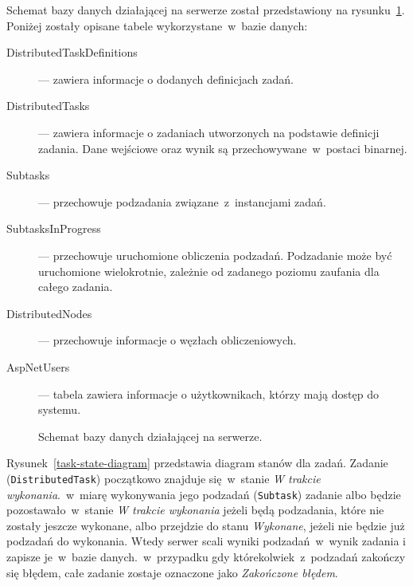 \documentclass[a4paper,11pt,twoside]{report}
\theoremstyle{definition}
\begin{document}
Schemat bazy danych działającej na serwerze został przedstawiony na rysunku~\ref{database-schema}.
Poniżej zostały opisane tabele wykorzystane~w~bazie danych:
\begin{description}
    \item [DistributedTaskDefinitions] --- zawiera informacje o dodanych definicjach zadań.
    \item [DistributedTasks] --- zawiera informacje o zadaniach utworzonych na podstawie definicji zadania. Dane wejściowe oraz wynik są przechowywane~w~postaci binarnej.
    \item [Subtasks] --- przechowuje podzadania związane~z~instancjami zadań.
    \item [SubtasksInProgress] --- przechowuje uruchomione obliczenia podzadań. Podzadanie może być uruchomione wielokrotnie, zależnie od zadanego poziomu zaufania dla całego zadania.
    \item [DistributedNodes] --- przechowuje informacje o węzłach obliczeniowych.
    \item [AspNetUsers] --- tabela zawiera informacje o użytkownikach, którzy mają dostęp do systemu.
\end{description}

\begin{figure} 
    \caption{Schemat bazy danych działającej na serwerze.}
    \label{database-schema}
\end{figure}


Rysunek~\ref{task-state-diagram} przedstawia diagram stanów dla zadań.
Zadanie (\texttt{DistributedTask}) początkowo znajduje się~w~stanie \textit{W trakcie wykonania}.~w~miarę wykonywania jego podzadań (\texttt{Subtask}) zadanie albo będzie pozostawało~w~stanie \textit{W trakcie wykonania} jeżeli będą podzadania, które nie zostały jeszcze wykonane, albo przejdzie do stanu \textit{Wykonane}, jeżeli nie będzie już podzadań do wykonania. Wtedy serwer scali wyniki podzadań~w~wynik zadania i zapisze je~w~bazie danych.~w~przypadku gdy którekolwiek~z~podzadań zakończy się błędem, całe zadanie zostaje oznaczone jako \textit{Zakończone błędem}.
\end{document}
